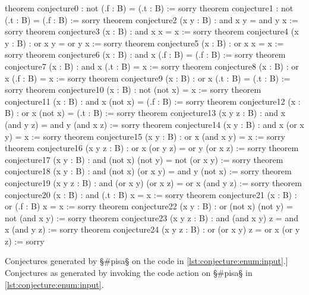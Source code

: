 \begin{listing}[H]
\begin{LeanCode}
theorem conjecture0            : not (.f : B) = (.t : B) := sorry
theorem conjecture1            : not (.t : B) = (.f : B) := sorry
theorem conjecture2 (x y : B)  : and x y = and y x := sorry
theorem conjecture3 (x : B)    : and x x = x := sorry
theorem conjecture4 (x y : B)  : or x y = or y x := sorry
theorem conjecture5 (x : B)    : or x x = x := sorry
theorem conjecture6 (x : B)    : and x (.f : B) = (.f : B) := sorry
theorem conjecture7 (x : B)    : and x (.t : B) = x := sorry
theorem conjecture8 (x : B)    : or x (.f : B) = x := sorry
theorem conjecture9 (x : B)    : or x (.t : B) = (.t : B) := sorry
theorem conjecture10 (x : B)   : not (not x) = x := sorry
theorem conjecture11 (x : B)   : and x (not x) = (.f : B) := sorry
theorem conjecture12 (x : B)   : or x (not x) = (.t : B) := sorry
theorem conjecture13 (x y z : B)
  : and x (and y z) = and y (and x z) := sorry
theorem conjecture14 (x y : B) : and x (or x y) = x := sorry
theorem conjecture15 (x y : B) : or x (and x y) = x := sorry
theorem conjecture16 (x y z : B)
  : or x (or y z) = or y (or x z) := sorry
theorem conjecture17 (x y : B)
  : and (not x) (not y) = not (or x y) := sorry
theorem conjecture18 (x y : B)
  : and (not x) (or x y) = and y (not x) := sorry
theorem conjecture19 (x y z : B)
  : and (or x y) (or x z) = or x (and y z) := sorry
theorem conjecture20 (x : B)   : and (.t : B) x = x := sorry
theorem conjecture21 (x : B)   : or (.f : B) x = x := sorry
theorem conjecture22 (x y : B)
  : or (not x) (not y) = not (and x y) := sorry
theorem conjecture23 (x y z : B)
  : and (and x y) z = and x (and y z) := sorry
theorem conjecture24 (x y z : B)
  : or (or x y) z = or x (or y z) := sorry
\end{LeanCode}
\caption
  [Conjectures generated by §\#pisa§ on the code in \cref{lst:conjecture:enum:input}.]
  {Conjectures as generated by invoking the code action on §\#pisa§ in \cref{lst:conjecture:enum:input}.}
\label{lst:conjecture:enum:output}
\end{listing}
